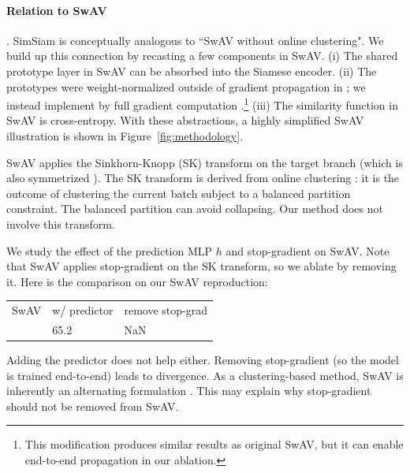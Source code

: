 \documentclass[final]{cvpr}
\newcommand{\tablestyle}[2]{\setlength{\tabcolsep}{#1}\renewcommand{\arraystretch}{#2}\centering\footnotesize}
\begin{document}
\paragraph{Relation to SwAV} \cite{Caron2020}. SimSiam is conceptually \mbox{analogous} to ``SwAV without online clustering".
We build up this connection by recasting a few components in SwAV.
(i) The shared prototype layer in SwAV can be \mbox{absorbed} into the Siamese encoder.
(ii) The prototypes were \mbox{weight-normalized} outside of gradient propagation in \cite{Caron2020};
we instead implement by full gradient computation \cite{Salimans2016}.\footnote{This modification produces similar results as original SwAV, but it can enable end-to-end propagation in our ablation.}
(iii) The similarity function in SwAV is cross-entropy.
With these abstractions, a highly simplified SwAV illustration is shown in Figure~\ref{fig:methodology}. 

SwAV applies the Sinkhorn-Knopp (SK) transform \cite{Cuturi2013} on the target branch (which is also symmetrized \cite{Caron2020}). 
The SK transform is derived from online clustering \cite{Caron2020}: it is the outcome of clustering the current batch subject to a balanced partition constraint. The balanced partition can avoid collapsing.
Our method does not involve this transform.

We study the effect of the prediction MLP $h$ and stop-gradient on SwAV. 
Note that SwAV applies stop-gradient on the SK transform, so we ablate by removing it.
Here is the comparison on our SwAV reproduction:
{
\begin{center}
\vspace{-.2em}
\small
\tablestyle{1pt}{1.1}
\begin{tabular}{x{72} x{72} x{72}}
SwAV & w/ predictor & remove stop-grad \\
 & 65.2 & NaN \\
\end{tabular}
\vspace{-.2em}
\end{center}
}
\noindent Adding the predictor does not help either. 
Removing stop-gradient (so the model is trained end-to-end) leads to divergence.
As a clustering-based method, SwAV is inherently an alternating formulation \cite{Caron2020}. This may explain why stop-gradient should not be removed from SwAV.
\end{document}
